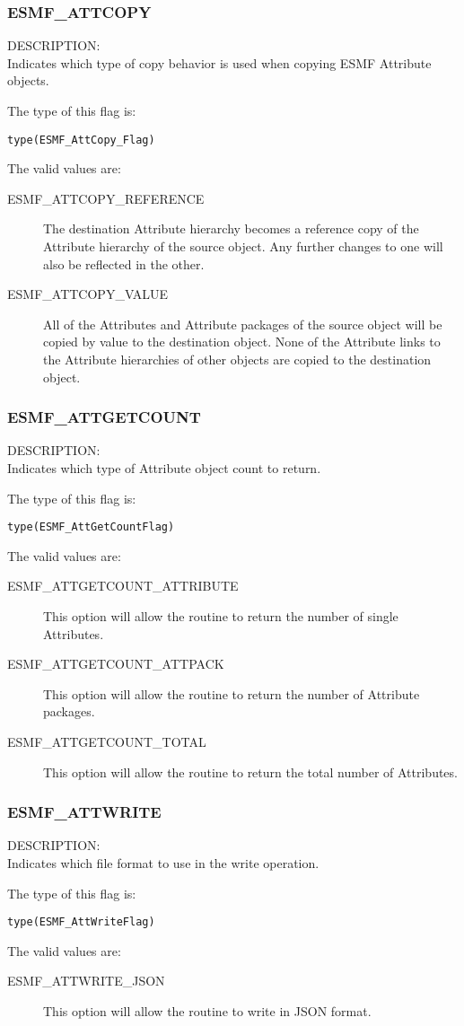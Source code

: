
\subsubsection{ESMF\_ATTCOPY}
\label{const:attcopy}
{\sf DESCRIPTION:\\}
Indicates which type of copy behavior is used when copying ESMF Attribute objects.

The type of this flag is:

{\tt type(ESMF\_AttCopy\_Flag)}

The valid values are:
\begin{description}
  \item[ESMF\_ATTCOPY\_REFERENCE]
    The destination Attribute hierarchy becomes a reference copy of
    the Attribute hierarchy of the source object. Any further changes to one
    will also be reflected in the other.
  \item[ESMF\_ATTCOPY\_VALUE]
    All of the Attributes and Attribute packages of the source object will be
    copied by value to the destination object. None of the Attribute links to
    the Attribute hierarchies of other objects are copied to the
    destination object.
\end{description}

\subsubsection{ESMF\_ATTGETCOUNT}
\label{const:attgetcount}

{\sf DESCRIPTION:\\}
Indicates which type of Attribute object count to return.

The type of this flag is:

{\tt type(ESMF\_AttGetCountFlag)}

The valid values are:
\begin{description}
	\item[ESMF\_ATTGETCOUNT\_ATTRIBUTE]
	This option will allow the routine to return the number of single Attributes.
	\item[ESMF\_ATTGETCOUNT\_ATTPACK]
	This option will allow the routine to return the number of Attribute packages.
	\item[ESMF\_ATTGETCOUNT\_TOTAL]
	This option will allow the routine to return the total number of Attributes.
\end{description}

\subsubsection{ESMF\_ATTWRITE}
\label{const:attwrite}

{\sf DESCRIPTION:\\}
Indicates which file format to use in the write operation.

The type of this flag is:

{\tt type(ESMF\_AttWriteFlag)}

The valid values are:
\begin{description}
	\item[ESMF\_ATTWRITE\_JSON]
	This option will allow the routine to write in JSON format.
\end{description}

